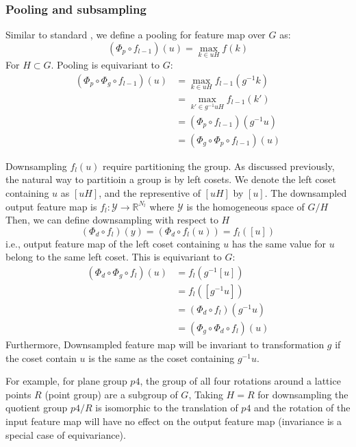 \documentclass{IEEEtran}
\begin{document}
\subsubsection*{Pooling and subsampling}
Similar to standard , we define a pooling for feature map over $G$ as:
\begin{equation}
    (\Phi_p \circ f_{l-1})(u) = \max_{k \in uH} f(k)
\end{equation}
For $H \subset G$. Pooling is equivariant to $G$:
\begin{align*}
    (\Phi_p \circ \Phi_g \circ f_{l-1})(u) &= \max_{k \in uH} f_{l-1}(g^{-1}k) \\
        & = \max_{k'\in g^{-1}uH} f_{l-1}(k') \\
        &= (\Phi_p \circ f_{l-1})(g^{-1}u) \\
        &= (\Phi_g \circ \Phi_p \circ f_{l-1})(u)
\end{align*}

Downsampling $f_{l}(u)$ require partitioning the group. As discussed previously, the natural way to partitioin a group
is by left cosets. We denote the left coset containing $u$ as $[uH]$, and the representive of $[uH]$ by $[u]$. The downsampled output feature map is 
$f_l\colon \mathcal{Y} \to \mathbb{R}^{N_l}$ where $\mathcal{Y}$ is the homogeneous space of $G/H$
Then, we can define downsampling with respect to $H$
\begin{equation}
    (\Phi_d \circ f_l)(y) = (\Phi_d \circ f_l(u)) = f_l([u])
\end{equation}
i.e., output feature map of the left coset containing $u$ has the same value for $u$ belong to the same left coset. 
This is equivariant to $G$:
\begin{align*}
    (\Phi_d \circ \Phi_g \circ f_l)(u) &= f_l(g^{-1}[u]) \\
    &= f_l([g^{-1}u]) \\
    &= (\Phi_d \circ f_l)(g^{-1}u) \\
    &= (\Phi_g \circ \Phi_d \circ f_l)(u)
\end{align*}
Furthermore, Downsampled feature map will be invariant to transformation $g$ 
if the coset contain $u$ is the same as the coset containing $g^{-1}u$.

For example, for plane group $p4$, the group of all four rotations around a lattice points $R$ (point group) are a subgroup of $G$,
Taking $H = R$ for downsampling
the quotient group $p4/R$ is isomorphic to the translation of $p4$ and 
the rotation of the input feature map will have no effect on the output feature map (invariance is a special case of equivariance). 
\end{document}
